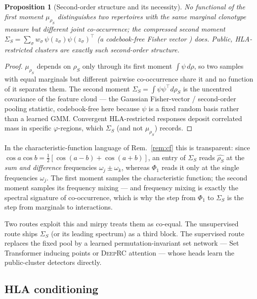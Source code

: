 \documentclass[11pt]{article}
\theoremstyle{oldplain}
\newtheorem{proposition}{Proposition}
\theoremstyle{oldrem}
\begin{document}
\begin{proposition}[Second-order structure and its necessity]\label{prop:interact}
No functional of the first moment $\mu_{\rho_S}$ distinguishes two repertoires with the same marginal clonotype
measure but different joint co-occurrence; the compressed second moment $\Sigma_S=\sum_\sigma w_\sigma\,
\psi(z_\sigma)\psi(z_\sigma)^\top$ (a codebook-free Fisher vector \cite{Perronnin2007,Jegou2010}) does. Public,
{\scshape HLA}-restricted clusters \cite{Emerson2017,DeWitt2018,Glanville2017} are exactly such second-order
structure.
\end{proposition}
\begin{proof}
$\mu_{\rho_S}$ depends on $\rho_S$ only through its first moment $\int\psi\,d\rho$, so two samples with equal
marginals but different pairwise co-occurrence share it and no function of it separates them. The second moment
$\Sigma_S=\int\psi\psi^\top d\rho_S$ is the uncentred covariance of the feature cloud --- the Gaussian
Fisher-vector / second-order pooling statistic, codebook-free here because $\psi$ is a fixed random basis rather
than a learned {\scshape GMM}. Convergent {\scshape HLA}-restricted responses deposit correlated mass in specific
$\varphi$-regions, which $\Sigma_S$ (and not $\mu_{\rho_S}$) records. \end{proof}

In the characteristic-function language of Rem.~\ref{rem:cf} this is transparent: since
$\cos a\cos b=\tfrac12[\cos(a{-}b)+\cos(a{+}b)]$, an entry of $\Sigma_S$ reads $\widehat{\rho_S}$ at the
\emph{sum and difference} frequencies $\omega_j\pm\omega_k$, whereas $\Phi_1$ reads it only at the single
frequencies $\omega_j$. The first moment samples the characteristic function; the second moment samples its
frequency mixing --- and frequency mixing is exactly the spectral signature of co-occurrence, which is why the
step from $\Phi_1$ to $\Sigma_S$ is the step from marginals to interactions.

Two routes exploit this and mirpy treats them as co-equal. The unsupervised route ships $\Sigma_S$ (or its
leading spectrum) as a third block. The supervised route replaces the fixed pool by a learned
permutation-invariant set network --- Set Transformer inducing points or {\scshape DeepRC} attention
\cite{Lee2019,Widrich2020} --- whose heads learn the public-cluster detectors directly.

\subsection{{\normalfont\scshape HLA} conditioning}\label{sec:samp-hla}
\end{document}
